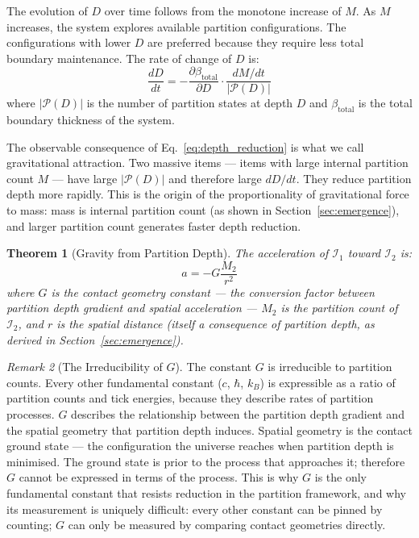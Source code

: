 \documentclass[11pt,twocolumn,a4paper]{article}
\theoremstyle{plain}
\newtheorem{theorem}{Theorem}[section]
\theoremstyle{definition}
\theoremstyle{remark}
\newtheorem{remark}[theorem]{Remark}
\begin{document}
The evolution of $D$ over time follows from the monotone increase of $M$. As
$M$ increases, the system explores available partition configurations. The
configurations with lower $D$ are preferred because they require less total
boundary maintenance. The rate of change of $D$ is:
\begin{equation}
    \frac{dD}{dt} = -\frac{\partial \beta_{\mathrm{total}}}{\partial D} \cdot
    \frac{dM/dt}{|\mathcal{P}(D)|}
    \label{eq:depth_reduction}
\end{equation}
where $|\mathcal{P}(D)|$ is the number of partition states at depth $D$ and
$\beta_{\mathrm{total}}$ is the total boundary thickness of the system.

The observable consequence of Eq.~\eqref{eq:depth_reduction} is what we call
gravitational attraction. Two massive items --- items with large internal
partition count $M$ --- have large $|\mathcal{P}(D)|$ and therefore large
$dD/dt$. They reduce partition depth more rapidly. This is the origin of the
proportionality of gravitational force to mass: mass is internal partition count
(as shown in Section~\ref{sec:emergence}), and larger partition count generates
faster depth reduction.

\begin{theorem}[Gravity from Partition Depth]
\label{thm:gravity}
The acceleration of $\mathcal{I}_1$ toward $\mathcal{I}_2$ is:
\begin{equation}
    a = -G \frac{M_2}{r^2}
    \label{eq:gravity}
\end{equation}
where $G$ is the \emph{contact geometry constant} --- the conversion factor
between partition depth gradient and spatial acceleration --- $M_2$ is the
partition count of $\mathcal{I}_2$, and $r$ is the spatial distance
(itself a consequence of partition depth, as derived in
Section~\ref{sec:emergence}).
\end{theorem}

\begin{remark}[The Irreducibility of $G$]
\label{rem:G_irreducible}
The constant $G$ is irreducible to partition counts. Every other fundamental
constant ($c$, $\hbar$, $k_B$) is expressible as a ratio of partition counts
and tick energies, because they describe rates of partition processes. $G$
describes the relationship between the partition depth gradient and the spatial
geometry that partition depth induces. Spatial geometry is the contact ground
state --- the configuration the universe reaches when partition depth is
minimised. The ground state is prior to the process that approaches it; therefore
$G$ cannot be expressed in terms of the process. This is why $G$ is the only
fundamental constant that resists reduction in the partition framework, and why
its measurement is uniquely difficult: every other constant can be pinned by
counting; $G$ can only be measured by comparing contact geometries directly.
\end{remark}
\end{document}
